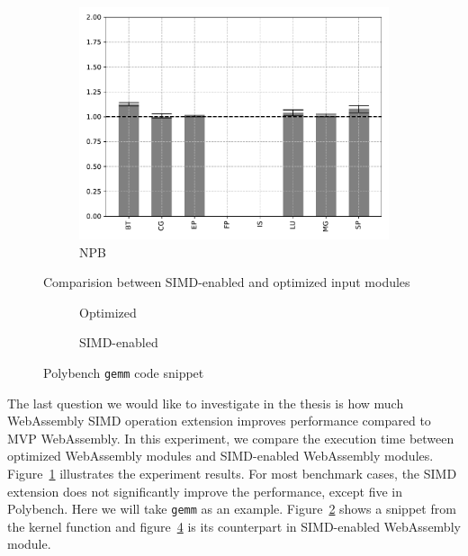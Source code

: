 \begin{figure}
\begin{subfigure}[t]{.45\textwidth}
        \includegraphics[width=\textwidth]{Images/6.3.RQ3/npb-simd-speedup}
        \caption{NPB}
    \end{subfigure}
    \caption{Comparision between SIMD-enabled and optimized input modules}
    \label{fig:rq3}
\end{figure}

\begin{figure}
    \centering
    \begin{subfigure}{\textwidth}
        
        \caption{Optimized}
        \label{fig:polybench-gemm-opt-code}
    \end{subfigure}
    \begin{subfigure}{\textwidth}
        
        \caption{SIMD-enabled}
        \label{fig:polybench-gemm-simd-code}
    \end{subfigure}
    \caption{Polybench \texttt{gemm} code snippet}
\end{figure}

The last question we would like to investigate in the thesis is how much WebAssembly SIMD operation extension improves performance compared to MVP WebAssembly. In this experiment, we compare the execution time between optimized WebAssembly modules and SIMD-enabled WebAssembly modules. Figure~\ref{fig:rq3} illustrates the experiment results. For most benchmark cases, the SIMD extension does not significantly improve the performance, except five in Polybench. Here we will take \texttt{gemm} as an example. Figure~\ref{fig:polybench-gemm-opt-code} shows a snippet from the kernel function and figure~\ref{fig:polybench-gemm-simd-code} is its counterpart in SIMD-enabled WebAssembly module.



